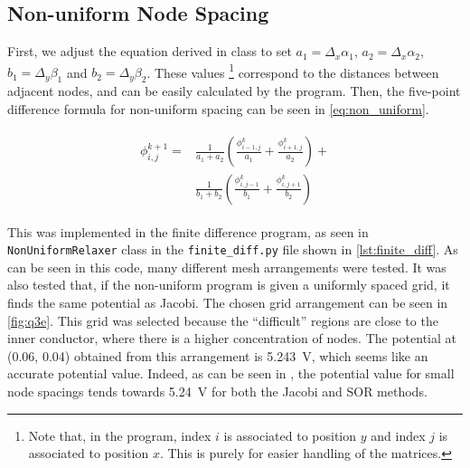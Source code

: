 \documentclass[a4paper,titlepage]{article}
\begin{document}
	\subsection{Non-uniform Node Spacing}
	
	First, we adjust the equation derived in class to set $a_1 = \Delta_x\alpha_1$, $a_2 = \Delta_x\alpha_2$, $b_1 = \Delta_y\beta_1$ and $b_2 = \Delta_y\beta_2$. These values \footnote{Note that, in the program, index $i$ is associated to position $y$ and index $j$ is associated to position $x$. This is purely for easier handling of the matrices.} correspond to the distances between adjacent nodes, and can be easily calculated by the program. Then, the five-point difference formula for non-uniform spacing can be seen in \autoref{eq:non_uniform}.
	
	\begin{align} \label{eq:non_uniform}
		\begin{split}
			\phi^{k + 1}_{i,j} = 
			&\frac{1}{a_1 + a_2}\left(\frac{\phi^k_{i - 1,j}}{a_1} + \frac{\phi^k_{i + 1,j}}{a_2}\right) + \\
			&\frac{1}{b_1 + b_2}\left(\frac{\phi^k_{i, j - 1}}{b_1} + \frac{\phi^k_{i, j + 1}}{b_2}\right)
		\end{split}
	\end{align}
	
	This was implemented in the finite difference program, as seen in \texttt{NonUniformRelaxer} class in the \texttt{finite_diff.py} file shown in \autoref{lst:finite_diff}. As can be seen in this code, many different mesh arrangements were tested. It was also tested that, if the non-uniform program is given a uniformly spaced grid, it finds the same potential as Jacobi. The chosen grid arrangement can be seen in \autoref{fig:q3e}. This grid was selected because the ``difficult'' regions are close to the inner conductor, where there is a higher concentration of nodes. The potential at (0.06, 0.04) obtained from this arrangement is \SI{5.243}{\volt}, which seems like an accurate potential value. Indeed, as can be seen in , the potential value for small node spacings tends towards \SI{5.24}{\volt} for both the Jacobi and SOR methods.
	
\end{document}
